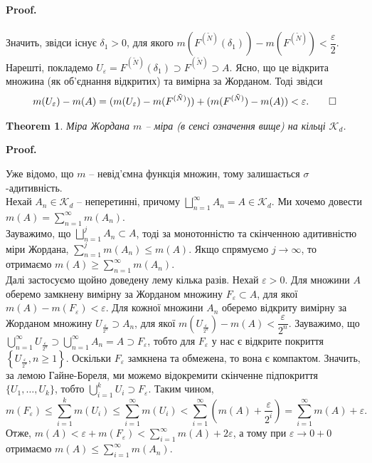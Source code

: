 \documentclass[a4paper, 10pt]{article}
\makeatletter
\theoremstyle{theoremdd}
\newtheorem{theorem}{Theorem}[subsection]
\renewenvironment{proof}[1][Proof.\\]{\par
\pushQED{\hfill \qed}%
\normalfont \topsep6\p@\@plus6\p@\relax
\trivlist
\item\relax
{\bfseries
#1\@addpunct{.}}\hspace\labelsep\ignorespaces
}{%
\popQED\endtrivlist\@endpefalse
}
\makeatother
\begin{document}
\begin{proof}
\begin{align*}
\end{align*}
Значить, звідси існує $\delta_1 > 0$, для якого $m(F^{(\tilde{N})}(\delta_1)) - m(F^{(\tilde{N})}) < \dfrac{\varepsilon}{2}$.\\
Нарешті, покладемо $U_\varepsilon = F^{(\tilde{N})}(\delta_1) \supset F^{(\tilde{N})} \supset A$. Ясно, що це відкрита множина (як об'єднання відкритих) та вимірна за Жорданом. Тоді звідси
\begin{gather*}
m(U_\varepsilon) - m(A) = (m(U_\varepsilon) - m(F^{(\tilde{N})})) + (m(F^{(\tilde{N})}) - m(A)) < \varepsilon. \qedhere
\end{gather*}
\end{proof}

\begin{theorem}
Міра Жордана $m$ -- міра (в сенсі означення вище) на кільці $\mathcal{K}_d$.
\end{theorem}

\begin{proof}
Уже відомо, що $m$ -- невід'ємна функція множин, тому залишається $\sigma$-адитивність.\\
Нехай $A_n \in \mathcal{K}_d$ -- неперетинні, причому $\displaystyle\bigsqcup_{n=1}^\infty A_n = A \in \mathcal{K}_d$. Ми хочемо довести $m(A) = \displaystyle\sum_{n=1}^\infty m(A_n)$.\\
Зауважимо, що $\displaystyle\bigsqcup_{n=1}^j A_n \subset A$, тоді за монотонністю та скінченною адитивністю міри Жордана, $\displaystyle\sum_{n=1}^j m(A_n) \leq m(A)$. Якщо спрямуємо $j \to \infty$, то отримаємо $m(A) \geq \displaystyle\sum_{n=1}^\infty m(A_n)$.\\
Далі застосуємо щойно доведену лему кілька разів. Нехай $\varepsilon > 0$. Для множини $A$ оберемо замкнену вимірну за Жорданом множину $F_\varepsilon \subset A$, для якої $m(A) - m(F_\varepsilon) < \varepsilon$. Для кожної множини $A_n$ оберемо відкриту вимірну за Жорданом множину $U_{\frac{\varepsilon}{2^n}} \supset A_n$, для якої $m(U_{\frac{\varepsilon}{2^n}}) - m(A) < \dfrac{\varepsilon}{2^n}$. Зауважимо, що $\displaystyle\bigcup_{n=1}^\infty U_{\frac{\varepsilon}{2^n}} \supset \bigcup_{n=1}^\infty A_n = A \supset F_\varepsilon$, тобто для $F_\varepsilon$ у нас є відкрите покриття $\left\{ U_{\frac{\varepsilon}{2^n}}, n \geq 1\right\}$. Оскільки $F_\varepsilon$ замкнена та обмежена, то вона є компактом. Значить, за лемою Гайне-Бореля, ми можемо відокремити скінченне підпокриття $\{U_1,\dots,U_k\}$, тобто $\displaystyle\bigcup_{i=1}^k U_i \supset F_\varepsilon$. Таким чином,
\[
m(F_\varepsilon) \leq \displaystyle\sum_{i=1}^k m(U_i) \leq \sum_{i=1}^\infty m(U_i) < \sum_{i=1}^\infty \left(m(A) + \dfrac{\varepsilon}{2^i} \right) = \sum_{i=1}^\infty m(A) + \varepsilon.
\]
Отже, $\displaystyle m(A) < \varepsilon + m(F_\varepsilon) < \sum_{i=1}^\infty m(A) + 2 \varepsilon$, а тому при $\varepsilon \to 0+0$ отримаємо $m(A) \leq \displaystyle\sum_{i=1}^\infty m(A_n)$.
\end{proof}
\end{document}
